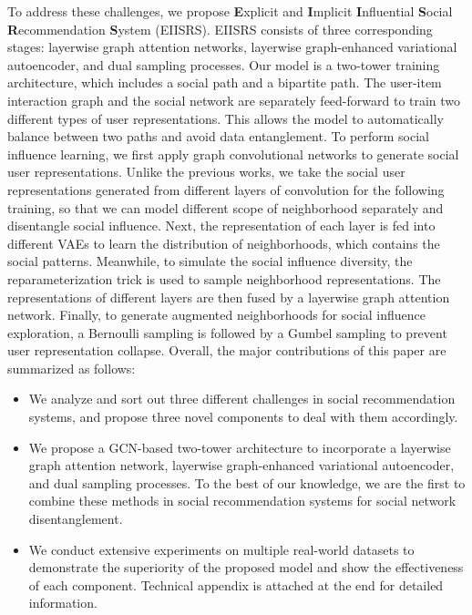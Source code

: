 \documentclass[letterpaper]{article} %
\begin{document}
To address these challenges, we propose \textbf{E}xplicit and \textbf{I}mplicit \textbf{I}nfluential \textbf{S}ocial \textbf{R}ecommendation \textbf{S}ystem (EIISRS). EIISRS consists of three corresponding stages: layerwise graph attention networks, layerwise graph-enhanced variational autoencoder, and dual sampling processes. Our model is a two-tower training architecture, which includes a social path and a bipartite path. The user-item interaction graph and the social network are separately feed-forward to train two different types of user representations. This allows the model to automatically balance between two paths and avoid data entanglement. To perform social influence learning, we first apply graph convolutional networks to generate social user representations. Unlike the previous works, we take the social user representations generated from different layers of convolution for the following training, so that we can model different scope of neighborhood separately and disentangle social influence. Next, the representation of each layer is fed into different VAEs to learn the distribution of neighborhoods, which contains the social patterns. Meanwhile, to simulate the social influence diversity, the reparameterization trick is used to sample neighborhood representations. The representations of different layers are then fused by a layerwise graph attention network. Finally, to generate augmented neighborhoods for social influence exploration, a Bernoulli sampling is followed by a Gumbel sampling to prevent user representation collapse. Overall, the major contributions of this paper are summarized as follows:

\begin{itemize}
    \item We analyze and sort out three different challenges in social recommendation systems, and propose three novel components to deal with them accordingly.
    \item We propose a GCN-based two-tower architecture to incorporate a layerwise graph attention network, layerwise graph-enhanced variational autoencoder, and dual sampling processes. To the best of our knowledge, we are the first to combine these methods in social recommendation systems for social network disentanglement. 
    \item We conduct extensive experiments on multiple real-world datasets to demonstrate the superiority of the proposed model and show the effectiveness of each component. Technical appendix is attached at the end for detailed information. 
\end{itemize}
\end{document}
